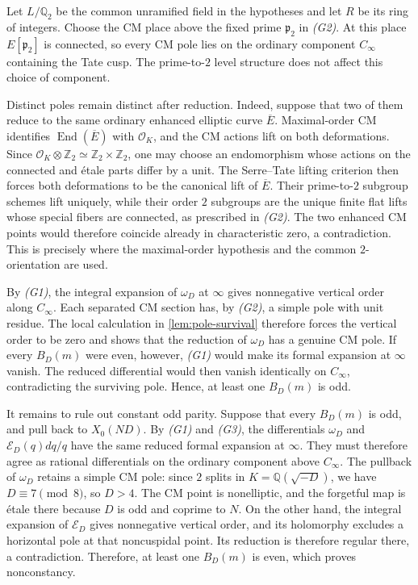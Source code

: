 \documentclass[11pt]{amsart}
\theoremstyle{remark}
\numberwithin{equation}{section}
\newcommand{\Q}{\mathbb Q}
\newcommand{\Z}{\mathbb Z}
\newcommand{\cO}{\mathcal O}
\newcommand{\End}{\operatorname{End}}
\begin{document}
Let $L/\Q_2$ be the common unramified field in the hypotheses and let $R$ be
its ring of integers.  Choose the CM place above the fixed prime
$\mathfrak p_2$ in \emph{(G2)}.  At this place $E[\mathfrak p_2]$ is
connected, so every CM pole lies on the ordinary component $C_\infty$
containing the Tate cusp.  The prime-to-$2$ level structure does not affect
this choice of component.

Distinct poles remain distinct after reduction.  Indeed, suppose that two
of them reduce to the same ordinary enhanced elliptic curve $\overline E$.
Maximal-order CM identifies $\End(\overline E)$ with $\cO_K$, and the CM
actions lift on both deformations.  Since
$\cO_K\otimes\Z_2\simeq\Z_2\times\Z_2$, one may choose an endomorphism whose
actions on the connected and \'etale parts differ by a unit.  The
Serre--Tate lifting criterion then forces both deformations to be the
canonical lift of $\overline E$.  Their prime-to-$2$ subgroup schemes lift
uniquely, while their order $2$ subgroups are the unique finite flat lifts
whose special fibers are connected, as prescribed in \emph{(G2)}.  The two
enhanced CM points would therefore coincide already in
characteristic zero, a contradiction.  This is precisely where the
maximal-order hypothesis and the common $2$-orientation are used.

By \emph{(G1)}, the integral expansion of $\omega_D$ at $\infty$ gives
nonnegative vertical order along $C_\infty$.  Each separated CM section has,
by \emph{(G2)}, a simple pole with unit residue.  The local calculation in
\cref{lem:pole-survival} therefore forces the vertical order to be zero and
shows that the reduction of $\omega_D$ has a genuine CM pole.  If every
$B_D(m)$ were even, however, \emph{(G1)} would make its formal expansion at
$\infty$ vanish.  The reduced differential would then vanish identically on
$C_\infty$, contradicting the surviving pole.  Hence, at least one $B_D(m)$
is odd.

It remains to rule out constant odd parity.  Suppose that every $B_D(m)$ is
odd, and pull back to $X_0(ND)$.  By \emph{(G1)} and \emph{(G3)}, the
differentials $\omega_D$ and $\mathcal E_D(q)dq/q$ have the same reduced
formal expansion at $\infty$.  They must therefore agree as rational
differentials on the ordinary component above $C_\infty$.  The pullback of
$\omega_D$ retains a simple CM pole: since $2$ splits in
$K=\Q(\sqrt{-D})$, we have $D\equiv7\pmod8$, so $D>4$. The CM point is
nonelliptic, and the forgetful map is \'etale there because $D$ is odd and
coprime to $N$.  On the other hand, the integral expansion of
$\mathcal E_D$ gives nonnegative vertical order, and its holomorphy excludes
a horizontal pole at that noncuspidal point.  Its reduction is therefore
regular there, a contradiction.  Therefore, at least one $B_D(m)$ is even, which
proves nonconstancy.
\end{document}
